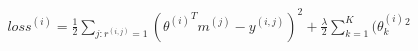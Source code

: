 \begin{align}
loss^{(i)} = \frac{1}{2} \sum_{j:r^{(i,j)}=1} ({\theta^{(i)}}^T m^{(j)} - y^{(i,j)})^2 + \frac{\lambda}{2} \sum_{k=1}^{K} (\theta_k^{(i)} ^2
\end{align}